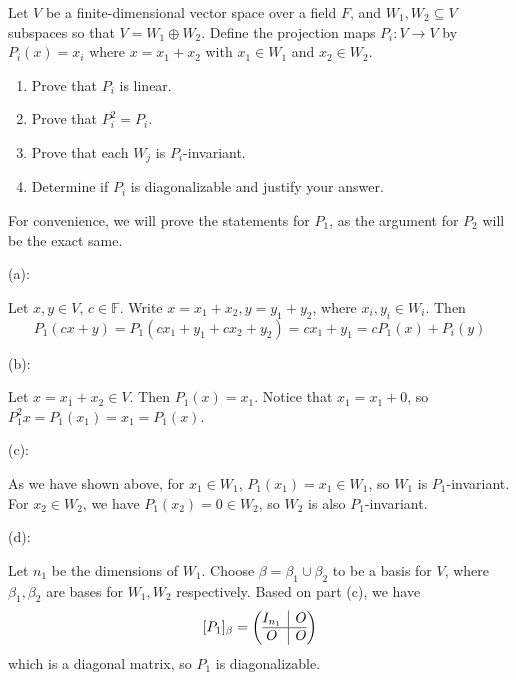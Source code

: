 \documentclass{eh-homework}
\begin{document}
    \begin{question}{8}
    Let $V$ be a finite-dimensional vector space over a field $F$, and $W_1, W_2 \subseteq V$ subspaces so that $V = W_1 \oplus W_2$. Define the projection maps $P_i : V \to V$ by $P_i(x) = x_i$ where $x = x_1 + x_2$ with $x_1 \in W_1$ and $x_2 \in W_2$.
    
    \begin{enumerate}[label=(\alph*)]
        \item Prove that $P_i$ is linear.
        \item Prove that $P_i^2 = P_i$.
        \item Prove that each $W_j$ is $P_i$-invariant.
        \item Determine if $P_i$ is diagonalizable and justify your answer.
    \end{enumerate}
    \tcblower
    For convenience, we will prove the statements for \(P_1\), as the argument for \(P_2\) will be the exact same.

    (a):

    Let \(x,y \in V\), \(c \in \mathbb{F}\). Write \(x = x_1 + x_2, y = y_1 + y_2\), where \(x_i,y_i \in W_i\). Then
    \[
        P_1(cx + y) = P_1(cx_1 + y_1 + cx_2 + y_2) = cx_1 + y_1 = cP_1(x) +P_i(y)
    \]

    \bigskip

    (b):

    Let \(x = x_1 + x_2 \in V\). Then \(P_1(x) = x_1\). Notice that \(x_1 = x_1 + 0\), so \(P_1^2 x = P_1(x_1) = x_1 = P_1(x)\).

    \bigskip

    (c):

    As we have shown above, for \(x_1 \in W_1\), \(P_1(x_1) = x_1 \in W_1\), so \(W_1\) is \(P_1\)-invariant. For \(x_2 \in W_2\), we have \(P_1(x_2) = 0 \in W_2\), so \(W_2\) is also \(P_1\)-invariant.

    \bigskip

    (d):

    Let \(n_1\) be the dimensions of \(W_1\). Choose \(\beta = \beta _1 \cup \beta _2\) to be a basis for \(V\), where \(\beta _1, \beta _2\) are bases for \(W_1, W_2\) respectively. Based on part (c), we have
    \[
        [P_1]_\beta = \left( \begin{array}{@{}c|c@{}}
            I_{n_1} & O \\
            \hline
            O & O
        \end{array} \right) 
    \]
    which is a diagonal matrix, so \(P_1\) is diagonalizable.
    \end{question}
    
\end{document}
